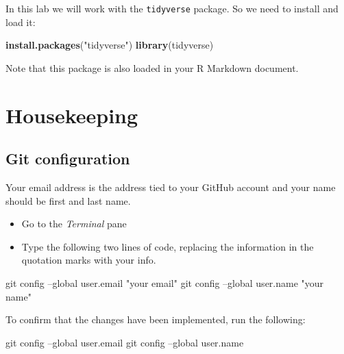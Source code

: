 \documentclass[]{book}
\newenvironment{Shaded}{\begin{snugshade}}{\end{snugshade}}
\newcommand{\KeywordTok}[1]{\textcolor[rgb]{0.13,0.29,0.53}{\textbf{#1}}}
\newcommand{\StringTok}[1]{\textcolor[rgb]{0.31,0.60,0.02}{#1}}
\newcommand{\FunctionTok}[1]{\textcolor[rgb]{0.00,0.00,0.00}{#1}}
\newcommand{\NormalTok}[1]{#1}
\providecommand{\tightlist}{%
  \setlength{\itemsep}{0pt}\setlength{\parskip}{0pt}}
\theoremstyle{definition}
\theoremstyle{definition}
\theoremstyle{definition}
\theoremstyle{remark}
\begin{document}
In this lab we will work with the \texttt{tidyverse} package. So we need
to install and load it:

\begin{Shaded}
\begin{Highlighting}[]
\KeywordTok{install.packages}\NormalTok{(}\StringTok{"tidyverse"}\NormalTok{)}
\KeywordTok{library}\NormalTok{(tidyverse) }
\end{Highlighting}
\end{Shaded}

Note that this package is also loaded in your R Markdown document.

\chapter{Housekeeping}\label{housekeeping}

\section{Git configuration}\label{git-configuration}

Your email address is the address tied to your GitHub account and your
name should be first and last name.

\begin{itemize}
\tightlist
\item
  Go to the \emph{Terminal} pane
\item
  Type the following two lines of code, replacing the information in the
  quotation marks with your info.
\end{itemize}

\begin{Shaded}
\begin{Highlighting}[]
\FunctionTok{git}\NormalTok{ config --global user.email }\StringTok{"your email"}
\FunctionTok{git}\NormalTok{ config --global user.name }\StringTok{"your name"}
\end{Highlighting}
\end{Shaded}

To confirm that the changes have been implemented, run the following:

\begin{Shaded}
\begin{Highlighting}[]
\FunctionTok{git}\NormalTok{ config --global user.email}
\FunctionTok{git}\NormalTok{ config --global user.name}
\end{Highlighting}
\end{Shaded}
\end{document}

